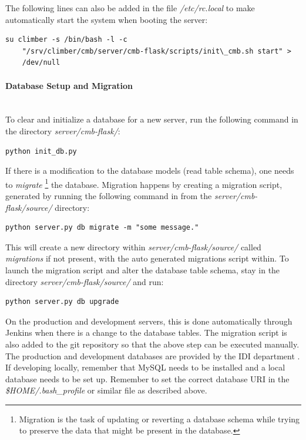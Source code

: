 The following lines can also be added in the file \textit{/etc/rc.local} to make automatically start the system when booting the server:
\begin{lstlisting}
su climber -s /bin/bash -l -c
    "/srv/climber/cmb/server/cmb-flask/scripts/init\_cmb.sh start" >
    /dev/null
\end{lstlisting}

\paragraph*{Database Setup and Migration} \hfill \\
To clear and initialize a database for a new server, run the following command in the directory \textit{server/cmb-flask/}:
\begin{lstlisting}
python init_db.py
\end{lstlisting}
If there is a modification to the database models (read table schema), one needs to \textit{migrate} \footnote{Migration is the task of updating or reverting a database schema while trying to preserve the data that might be present in the database.} the database. Migration happens by creating a migration script, generated by running the following command in from the \textit{server/cmb-flask/source/} directory:
\begin{lstlisting}
python server.py db migrate -m "some message."
\end{lstlisting}
This will create a new directory within \textit{server/cmb-flask/source/} called \textit{migrations} if not present, with the auto generated migrations script within. To launch the migration script and alter the database table schema, stay in the directory \textit{server/cmb-flask/source/} and run:
\begin{lstlisting}
python server.py db upgrade
\end{lstlisting}
On the production and development servers, this is done automatically through Jenkins when there is a change to the database tables. The migration script is also added to the git repository so that the above step can be executed manually. \\

The production and development databases are provided by the IDI department \cite{IDI}. If developing locally, remember that MySQL needs to be installed and a local database needs to be set up. Remember to set the correct database URI in the \textit{\$HOME/.bash\_profile} or similar file as described above.

